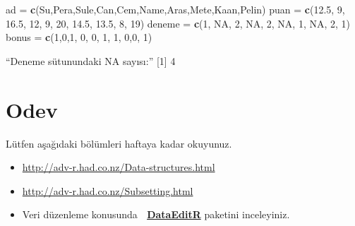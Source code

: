\documentclass[
  oneside]{book}
\newenvironment{Shaded}{\begin{snugshade}}{\end{snugshade}}
\newcommand{\ConstantTok}[1]{\textcolor[rgb]{0.56,0.35,0.01}{#1}}
\newcommand{\DecValTok}[1]{\textcolor[rgb]{0.00,0.00,0.81}{#1}}
\newcommand{\FloatTok}[1]{\textcolor[rgb]{0.00,0.00,0.81}{#1}}
\newcommand{\FunctionTok}[1]{\textcolor[rgb]{0.13,0.29,0.53}{\textbf{#1}}}
\newcommand{\NormalTok}[1]{#1}
\newcommand{\OtherTok}[1]{\textcolor[rgb]{0.56,0.35,0.01}{#1}}
\newcommand{\StringTok}[1]{\textcolor[rgb]{0.31,0.60,0.02}{#1}}
\begin{document}
\begin{Shaded}
\begin{Highlighting}[]
\NormalTok{ad }\OtherTok{=} \FunctionTok{c}\NormalTok{(}\StringTok{\textquotesingle{}Su\textquotesingle{}}\NormalTok{,}\StringTok{\textquotesingle{}Pera\textquotesingle{}}\NormalTok{,}\StringTok{\textquotesingle{}Sule\textquotesingle{}}\NormalTok{,}\StringTok{\textquotesingle{}Can\textquotesingle{}}\NormalTok{,}\StringTok{\textquotesingle{}Cem\textquotesingle{}}\NormalTok{,}\StringTok{\textquotesingle{}Name\textquotesingle{}}\NormalTok{,}\StringTok{\textquotesingle{}Aras\textquotesingle{}}\NormalTok{,}\StringTok{\textquotesingle{}Mete\textquotesingle{}}\NormalTok{,}\StringTok{\textquotesingle{}Kaan\textquotesingle{}}\NormalTok{,}\StringTok{\textquotesingle{}Pelin\textquotesingle{}}\NormalTok{)}
\NormalTok{puan }\OtherTok{=} \FunctionTok{c}\NormalTok{(}\FloatTok{12.5}\NormalTok{, }\DecValTok{9}\NormalTok{, }\FloatTok{16.5}\NormalTok{, }\DecValTok{12}\NormalTok{, }\DecValTok{9}\NormalTok{, }\DecValTok{20}\NormalTok{, }\FloatTok{14.5}\NormalTok{, }\FloatTok{13.5}\NormalTok{, }\DecValTok{8}\NormalTok{, }\DecValTok{19}\NormalTok{)}
\NormalTok{deneme }\OtherTok{=} \FunctionTok{c}\NormalTok{(}\DecValTok{1}\NormalTok{, }\ConstantTok{NA}\NormalTok{, }\DecValTok{2}\NormalTok{, }\ConstantTok{NA}\NormalTok{, }\DecValTok{2}\NormalTok{, }\ConstantTok{NA}\NormalTok{, }\DecValTok{1}\NormalTok{, }\ConstantTok{NA}\NormalTok{, }\DecValTok{2}\NormalTok{, }\DecValTok{1}\NormalTok{)}
\NormalTok{bonus }\OtherTok{=} \FunctionTok{c}\NormalTok{(}\DecValTok{1}\NormalTok{,}\DecValTok{0}\NormalTok{,}\DecValTok{1}\NormalTok{, }\DecValTok{0}\NormalTok{, }\DecValTok{0}\NormalTok{, }\DecValTok{1}\NormalTok{, }\DecValTok{1}\NormalTok{, }\DecValTok{0}\NormalTok{,}\DecValTok{0}\NormalTok{, }\DecValTok{1}\NormalTok{)}
\end{Highlighting}
\end{Shaded}

``Deneme sütunundaki NA sayısı:''
{[}1{]} 4

\hypertarget{odev-1}{%
\section{Odev}\label{odev-1}}

Lütfen aşağıdaki bölümleri haftaya kadar okuyunuz.

\begin{itemize}
\item
  \url{http://adv-r.had.co.nz/Data-structures.html}
\item
  \url{http://adv-r.had.co.nz/Subsetting.html}
\item
  Veri düzenleme konusunda 🔗 \href{https://dillonhammill.github.io/DataEditR/}{\textbf{DataEditR}} paketini inceleyiniz.
\end{itemize}
\end{document}
